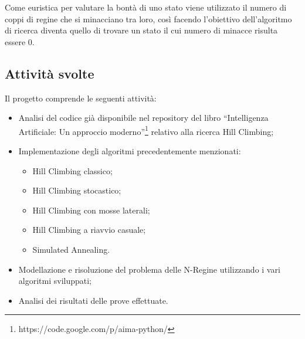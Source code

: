 Come euristica per valutare la bontà di uno stato viene utilizzato il numero di coppi di regine che si minacciano tra loro, così facendo l'obiettivo dell'algoritmo di ricerca diventa quello di trovare un stato il cui numero di minacce risulta essere 0.

\subsection{Attività svolte}

Il progetto comprende le seguenti attività:

\begin{itemize}
\item Analisi del codice già disponibile nel repository del libro ``Intelligenza Artificiale: Un approccio moderno''\footnote{https://code.google.com/p/aima-python/} relativo alla ricerca Hill Climbing;
\item Implementazione degli algoritmi precedentemente menzionati:
	\begin{itemize}
	\item Hill Climbing classico;
	\item Hill Climbing stocastico;
	\item Hill Climbing con mosse laterali;
	\item Hill Climbing a riavvio casuale;
	\item Simulated Annealing.
	\end{itemize}
\item Modellazione e risoluzione del problema delle N-Regine utilizzando i vari algoritmi sviluppati;
\item Analisi dei risultati delle prove effettuate.
\end{itemize}

